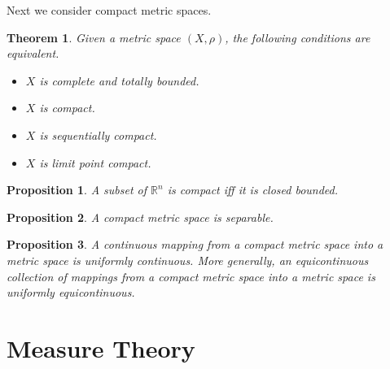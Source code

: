\documentclass[openany]{book}
\newtheorem{proposition}{Proposition}[chapter]
\newtheorem{theorem}{Theorem}[chapter]
\theoremstyle{definition}
\theoremstyle{remark}
\begin{document}
Next we consider compact metric spaces.
\begin{theorem}
    Given a metric space $(X,\rho)$, the following conditions are equivalent.
    \begin{itemize}
        \item $X$ is complete and totally bounded.
        \item $X$ is compact.
        \item $X$ is sequentially compact.
        \item $X$ is limit point compact.
    \end{itemize}
\end{theorem}
\begin{proposition}
    A subset of $\mathbb{R}^n$ is compact iff it is closed bounded.
\end{proposition}
\begin{proposition}
    A compact metric space is separable.
\end{proposition}
\begin{proposition}
    A continuous mapping from a compact metric space into a metric space is uniformly continuous. More generally, an equicontinuous collection of mappings from a compact metric space into a metric space is uniformly equicontinuous.
\end{proposition}

\chapter{Measure Theory}\label{chp:measure}
\end{document}
